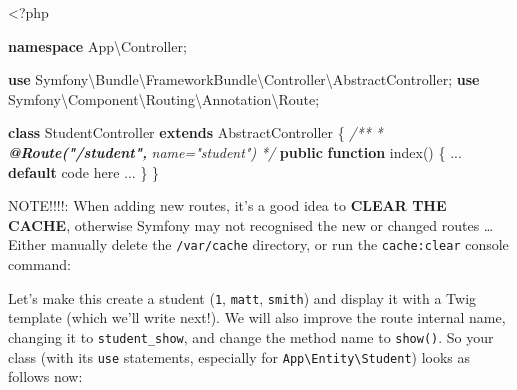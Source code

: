 \documentclass[a4paperpaper,openright]{book}
\newenvironment{Shaded}{}{}
\newcommand{\AnnotationTok}[1]{\textcolor[rgb]{0.38,0.63,0.69}{\textbf{\textit{#1}}}}
\newcommand{\CommentTok}[1]{\textcolor[rgb]{0.38,0.63,0.69}{\textit{#1}}}
\newcommand{\ExtensionTok}[1]{#1}
\newcommand{\KeywordTok}[1]{\textcolor[rgb]{0.00,0.44,0.13}{\textbf{#1}}}
\newcommand{\NormalTok}[1]{#1}
\newcommand{\OtherTok}[1]{\textcolor[rgb]{0.00,0.44,0.13}{#1}}
\newcommand{\StringTok}[1]{\textcolor[rgb]{0.25,0.44,0.63}{#1}}
\begin{document}
\begin{Shaded}
\begin{Highlighting}[]
\NormalTok{    <}\OtherTok{?}\NormalTok{php}
    
    \KeywordTok{namespace}\NormalTok{ App\textbackslash{}Controller}\OtherTok{;}
    
    \KeywordTok{use}\NormalTok{ Symfony\textbackslash{}Bundle\textbackslash{}FrameworkBundle\textbackslash{}Controller\textbackslash{}AbstractController}\OtherTok{;}
    \KeywordTok{use}\NormalTok{ Symfony\textbackslash{}Component\textbackslash{}Routing\textbackslash{}Annotation\textbackslash{}Route}\OtherTok{;}
    
    \KeywordTok{class}\NormalTok{ StudentController }\KeywordTok{extends}\NormalTok{ AbstractController}
\NormalTok{    \{}
        \CommentTok{/**}
\CommentTok{         * }\AnnotationTok{@Route("/student",}\CommentTok{ name="student")}
\CommentTok{         */}
        \KeywordTok{public} \KeywordTok{function}\NormalTok{ index}\OtherTok{()}
\NormalTok{        \{}
            \StringTok{...} \KeywordTok{default }\NormalTok{code here }\StringTok{...}
\NormalTok{        \}}
\NormalTok{    \}}
\end{Highlighting}
\end{Shaded}

NOTE!!!!: When adding new routes, it's a good idea to \textbf{CLEAR THE
CACHE}, otherwise Symfony may not recognised the new or changed routes
\ldots{} Either manually delete the \texttt{/var/cache} directory, or
run the \texttt{cache:clear} console command:

\begin{Shaded}
\end{Shaded}

Let's make this create a student (\texttt{1}, \texttt{matt},
\texttt{smith}) and display it with a Twig template (which we'll write
next!). We will also improve the route internal name, changing it to
\texttt{student\_show}, and change the method name to \texttt{show()}.
So your class (with its \texttt{use} statements, especially for
\texttt{App\textbackslash{}Entity\textbackslash{}Student}) looks as
follows now:
\end{document}
